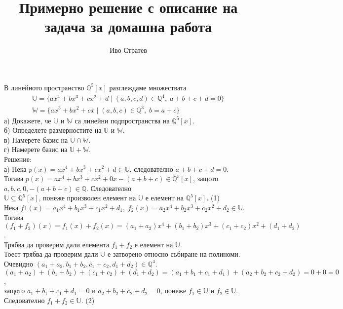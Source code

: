\documentclass[a4paper, 12pt, oneside]{article}
\title{Примерно решение с описание на задача за домашна работа}
\author{Иво Стратев}
\begin{document}
\maketitle
В линейното пространство \(\mathbb{Q}^5[x]\) разглеждаме множествата
\begin{align*}
    \mathbb{U} = \{ax^4 + bx^3 + cx^2 + d \; | \; (a, b, c, d) \in \mathbb{Q}^4, \; a + b + c + d = 0\} \\
    \mathbb{W} = \{ax^3 + bx^2 + cx \; | \; (a, b, c) \in \mathbb{Q}^3, \; b = a + c\}
\end{align*}
а) Докажете, че \(\mathbb{U}\) и  \(\mathbb{W}\) са линейни подпространства на \(\mathbb{Q}^5[x]\). \\
б) Определете размерностите на \(\mathbb{U}\) и  \(\mathbb{W}\). \\
в) Намерете базис на \(\mathbb{U} \cap \mathbb{W}\). \\
г) Намерете базис на \(\mathbb{U} + \mathbb{W}\). \\
Решение: \\
а) Нека \(p(x) = ax^4 + bx^3 + cx^2 + d \in \mathbb{U}\), следователно \(a + b + c + d = 0\). \\
Тогава \(p(x) = ax^4 + bx^3 + cx^2 + 0x - (a + b + c) \in \mathbb{Q}^5[x]\), защото \\
\(a, b, c, 0, - (a + b + c) \in \mathbb{Q}\). Следователно \\
\(\mathbb{U} \subseteq \mathbb{Q}^5[x]\), понеже произволен елемент на \(\mathbb{U}\) е елемент на \(\mathbb{Q}^5[x]\). (1) \\
Нека \(f1(x) = a_1x^4 + b_1x^3 + c_1x^2 + d_1, \; f_2(x) = a_2x^4 + b_2x^3 + c_2x^2 + d_2 \in \mathbb{U}\). \\
Тогава \((f_1 + f_2)(x) = f_1(x) + f_2(x) = (a_1 + a_2)x^4 + (b_1 + b_2)x^3 + (c_1 + c_2)x^2 + (d_1 + d_2)\). \\
Трябва да проверим дали елемента \(f_1 + f_2\) е елемент на \(\mathbb{U}\). \\
Тоест трябва да проверим дали \(\mathbb{U}\) е затворено относно събиране на полиноми. \\
Очевидно \((a_1 + a_2, b_1 + b_2, c_1 + c_2, d_1 + d_2) \in \mathbb{Q}^4\). \\
\((a_1 + a_2) + (b_1 + b_2) + (c_1 + c_2) + (d_1 + d_2) = (a_1 + b_1 + c_1 + d_1) + (a_2 + b_2 + c_2 + d_2) = 0 + 0 = 0\), \\
защото \(a_1 + b_1 + c_1 + d_1 = 0\) и \(a_2 + b_2 + c_2 + d_2 = 0\), понеже \(f_1 \in \mathbb{U}\) и \(f_2 \in \mathbb{U}\).
Следователно \(f_1 + f_2 \in \mathbb{U}\). (2) \\
\end{document}
